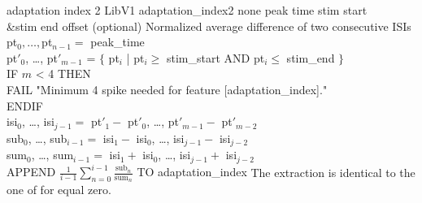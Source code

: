 \begin{efeature}
  {adaptation index 2}
  {LibV1}
  {adaptation\_index2}
  {none}
  {peak time}
  {stim start\\&stim end}
  {offset (optional)}
  {Normalized average difference of two consecutive ISIs}
  {
  pt$_0, \ldots, $pt$_{n-1} =$ peak\_time \\
  pt$'_0$, \ldots, pt$'_{m-1}$  = $\{$ pt$_i$ | pt$_i \ge$ stim\_start AND pt$_i \le$ stim\_end $\}$ \\
  IF $m$ < 4 THEN \+ \\
    FAIL "Minimum 4 spike needed for feature [adaptation\_index]." \- \\
  ENDIF \\
  isi$_0$, \ldots, isi$_{j-1} =$ pt$'_1 -$ pt$'_0$, \ldots, pt$'_{m-1} -$ pt$'_{m-2}$ \\
  sub$_0$, \ldots, sub$_{i-1} =$ isi$_1 -$ isi$_0$, \ldots, isi$_{j-1} -$ isi$_{j-2}$ \\
  sum$_0$, \ldots, sum$_{i-1} =$ isi$_1 +$ isi$_0$, \ldots, isi$_{j-1} +$ isi$_{j-2}$ \\
  APPEND $\frac{1}{i-1} \sum_{n=0}^{i-1} \frac{\mathrm{sub}_n}{\mathrm{sum}_n}$ TO adaptation\_index
  }
  The extraction is identical to the one of  for  equal zero.
  
\end{efeature}

